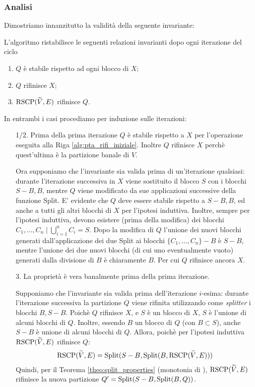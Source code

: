 \subsubsection{Analisi}
Dimostriamo innanzitutto la validità della seguente invariante:
\begin{lemma}
    \label{lem:pt_qx}
    L'algoritmo ristabilisce le seguenti relazioni invarianti dopo ogni iterazione del ciclo
    \begin{enumerate}
        \item $Q$ è stabile rispetto ad ogni blocco di $X$;
        \item $Q$ rifinisce $X$;
        \item $\textup{RSCP}(\widetilde{V},E)$ rifinisce $Q$.
    \end{enumerate}
\end{lemma}
\begin{proof2}
    In entrambi i casi procediamo per induzione sulle iterazioni:
    \begin{itemize}
        \item[1/2.] Prima della prima iterazione $Q$ è stabile rispetto a $X$ per l'operazione eseguita alla Riga \ref{alg:pta_rifi_iniziale}. Inoltre $Q$ rifinisce $X$ perchè quest'ultima è la partizione banale di $V$.

        Ora supponiamo che l'invariante sia valida prima di un'iterazione qualsiasi: durante l'iterazione successiva in $X$ viene sostituito il blocco $S$ con i blocchi $S-B, B$, mentre $Q$ viene modificato da sue applicazioni successive della funzione Split. E' evidente che $Q$ deve essere stabile rispetto a $S-B, B$, ed anche a tutti gli altri blocchi di $X$ per l'ipotesi induttiva. Inoltre, sempre per l'ipotesi induttiva, devono esistere (prima della modifica) dei blocchi $C_1, \dots, C_n \mid \bigcup_{i=1}^n C_i = S$. Dopo la modifica di $Q$ l'unione dei nuovi blocchi generati dall'applicazione dei due Split ai blocchi $\{C_1, \dots, C_n\} - B$ è $S-B$, mentre l'unione dei due nuovi blocchi (di cui uno eventualmente vuoto) generati dalla divisione di $B$ è chiaramente $B$. Per cui $Q$ rifinisce ancora $X$.
        \item[3.] La proprietà è vera banalmente prima della prima iterazione.

        Supponiamo che l'invariante sia valida prima dell'iterazione $i$-esima: durante l'iterazione successiva la
        partizione $Q$ viene rifinita utilizzando come \emph{splitter} i blocchi $B, S-B$. Poichè $Q$ rifinisce $X$, e $S$ è un blocco di $X$, $S$ è l'unione di alcuni blocchi di $Q$. Inoltre, essendo $B$ un blocco di $Q$ (con $B \subset S$), anche $S-B$ è unione di alcuni blocchi di $Q$. Allora, poichè per l'ipotesi induttiva $\textup{RSCP}(\widetilde{V},E)$ rifinisce $Q$:
        \begin{gather*}
            \textup{RSCP}(\widetilde{V},E) = \textup{Split}(S-B, \textup{Split}(B, \textup{RSCP}(\widetilde{V},E)))
        \end{gather*}
        Quindi, per il Teorema \ref{theo:split_properties} (monotonia di \splitfunc), $\textup{RSCP}(\widetilde{V},E)$ rifinisce la nuova partizione $Q' = \textup{Split}(S-B, \textup{Split}(B, Q))$.
    \end{itemize}
    \vspace*{-0.75cm}
\end{proof2}
